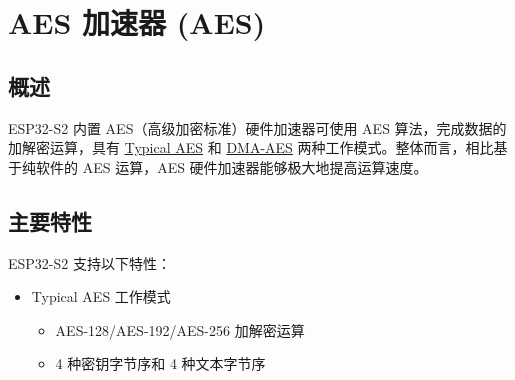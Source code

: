 \documentclass[main\_\_CN.tex]{subfiles}
\begin{document}
\setchineseformatting

\ifglobal
\else
    \listoftodos
    {\let\clearpage\relax \listofdonetodos}
    \tableofcontents
\fi



\hypertarget{aes}{}
\chapter{AES 加速器 (AES)}\label{mod:aes}


\section{概述}

ESP32-S2 内置 AES（高级加密标准）硬件加速器可使用 AES 算法，完成数据的加解密运算，具有 \hyperref[subsection:typicalaes]{Typical AES} 和 \hyperref[subsection:dma-aes]{DMA-AES} 两种工作模式。整体而言，相比基于纯软件的 AES 运算，AES 硬件加速器能够极大地提高运算速度。

\section{主要特性}

ESP32-S2 支持以下特性：
\begin{itemize}
    \item Typical AES 工作模式
        \begin{itemize}
            \item AES-128/AES-192/AES-256 加解密运算
            \item 4 种密钥字节序和 4 种文本字节序
        \end{itemize}
    \end{itemize}
\end{document}
